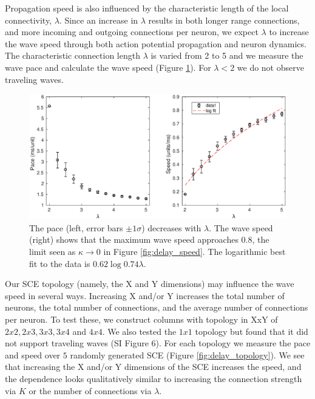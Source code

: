 \documentclass[12pt]{article}
\begin{document}
Propagation speed is also influenced by the characteristic length of the local connectivity, $\lambda$.
Since an increase in $\lambda$ results in both longer range connections, and more incoming and outgoing connections per neuron, we expect $\lambda$ to increase the wave speed through both action potential propagation and neuron dynamics.
The characteristic connection length $\lambda$ is varied from 2 to 5 and we measure the wave pace and calculate the wave speed (Figure \ref{fig:delay_lambda}).
For $\lambda<2$  we do not observe traveling waves.
\begin{figure}[!htb]
 \caption{ The pace (left, error bars $\pm 1 \sigma$) decreases with $\lambda$. 
           The wave speed (right) shows that the maximum wave speed approaches $0.8$, the limit seen as $\kappa \rightarrow 0$ in Figure \ref{fig:delay_speed}. 
           The logarithmic best fit to the data is $0.62\log{0.74\lambda}$.}
 \label{fig:delay_lambda}
 \centering
   \includegraphics[width=\textwidth]{fig/WaveSpeed_Lambda}
\end{figure}

\FloatBarrier

Our SCE topology (namely, the X and Y dimensions) may influence the wave speed in several ways.
Increasing X and/or Y increases the total number of neurons, the total number of connections, and the average number of connections per neuron.
To test these, we construct columns with topology in XxY of $2x2, 2x3, 3x3, 3x4$ and $4x4$.
We also tested the $1x1$ topology but found that it did not support traveling waves (SI Figure 6).
For each topology we measure the pace and speed over $5$ randomly generated SCE (Figure \ref{fig:delay_topology}).
We see that increasing the X and/or Y dimensions of the SCE increases the speed, and the dependence looks qualitatively similar to increasing the connection strength via $K$ or the number of connections via $\lambda$.
\end{document}
